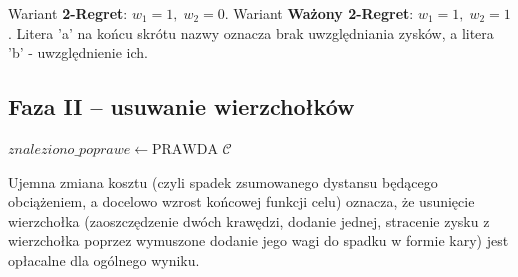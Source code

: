 \documentclass[11pt,a4paper]{article}
\begin{document}
\noindent
Wariant \textbf{2-Regret}: $w_1 = 1,\; w_2 = 0$.
Wariant \textbf{Ważony 2-Regret}: $w_1 = 1,\; w_2 = 1$.
Litera 'a' na końcu skrótu nazwy oznacza brak uwzględniania zysków, a litera 'b' - uwzględnienie ich.

\subsection{Faza II -- usuwanie wierzchołków}

\begin{algorithm}[H]
\caption{Faza II -- iteracyjne usuwanie wierzchołków poprawiające koszt}
\BlankLine
$\mathit{znaleziono\_poprawe} \leftarrow \text{PRAWDA}$\;
\BlankLine
{}
\KwReturn $\mathcal{C}$\;
\end{algorithm}

\noindent
Ujemna zmiana kosztu (czyli spadek zsumowanego dystansu będącego obciążeniem, a docelowo wzrost końcowej funkcji celu) oznacza, że usunięcie wierzchołka (zaoszczędzenie dwóch krawędzi, dodanie jednej, stracenie zysku z wierzchołka poprzez wymuszone dodanie jego wagi do spadku w formie kary) jest opłacalne dla ogólnego wyniku.
\end{document}
